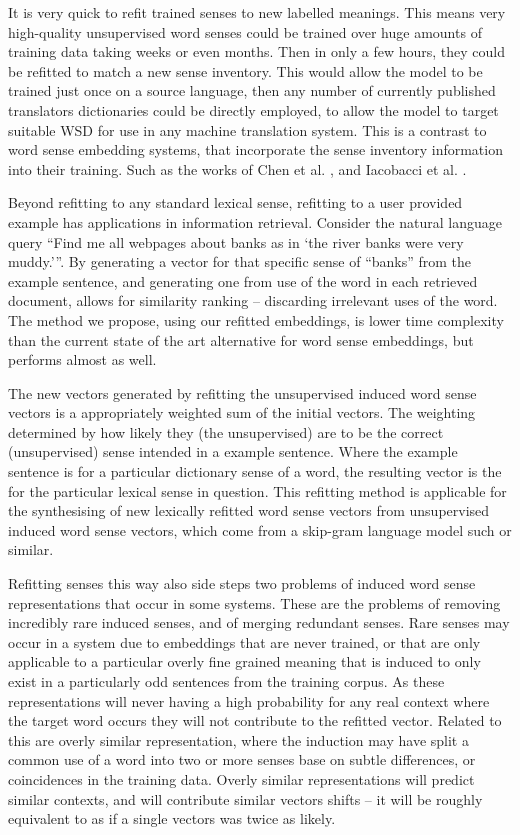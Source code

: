 \documentclass{sig-alternate}
\begin{document}
It is very quick to refit trained senses to new labelled meanings.
This means very high-quality unsupervised word senses could be trained over huge amounts of training data taking weeks or even months. Then in only a few hours, they could be refitted to match a new sense inventory. This would allow the model to be trained just once on a source language, then any number of currently published translators dictionaries could be directly employed, to allow the model to target suitable WSD for use in any machine translation system. This is a contrast to word sense embedding systems, that incorporate the sense inventory information into their training. Such as the works of Chen et al. \cite{Chen2014}, and Iacobacci et al. \cite{iacobacci2015sensembed}.


Beyond refitting to any standard lexical sense, refitting to a user provided example has applications in information retrieval. Consider the natural language query \enquote{Find me all webpages about banks as in \enquote{the river banks were very muddy.}}. By generating a vector for that specific sense of ``banks'' from the example sentence, and generating one from use of the word in each retrieved document, allows for similarity ranking -- discarding irrelevant uses of the word. The method we propose, using our refitted embeddings, is lower time complexity than the current state of the art alternative for word sense embeddings, but performs almost as well.


The new vectors generated by refitting the unsupervised induced word sense vectors is a appropriately weighted sum of the initial vectors. The weighting determined by how likely they (the unsupervised) are to be the correct (unsupervised) sense intended in a example sentence. Where the example sentence is for a particular dictionary sense of a word, the resulting vector is the for the particular lexical sense in question. This refitting method is applicable for the synthesising of new lexically refitted word sense vectors from unsupervised induced word sense vectors, which come from a skip-gram language model such or similar.


Refitting senses this way also side steps two problems of induced word sense representations that occur in some systems. These are the problems of removing incredibly rare induced senses, and of merging redundant senses.
Rare senses may occur in a system due to embeddings that are never trained, or that are only applicable to a particular overly fine grained meaning that is induced to only exist in a particularly odd sentences from the training corpus. As these representations will never having a high probability for any real context where the target word occurs they will not contribute to the refitted vector. Related to this are overly similar representation, where the induction may have split a common use of a word into two or more senses base on subtle differences, or coincidences in the training data. Overly similar representations will  predict similar contexts, and will contribute similar vectors shifts -- it will be roughly equivalent to as if a single vectors was twice as likely.
\end{document}
